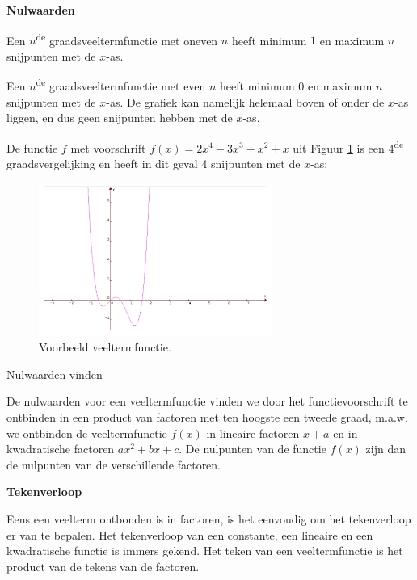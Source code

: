 \textbf{Nulwaarden}

 Een $n$\textsuperscript{de} graadsveeltermfunctie met oneven
$n$ heeft minimum $1$ en maximum $n$ snijpunten met de $x$-as.

 Een $n$\textsuperscript{de} graadsveeltermfunctie met even
$n$ heeft minimum $0$ en maximum $n$ snijpunten met de $x$-as. De grafiek
kan namelijk helemaal boven of onder de $x$-as liggen, en dus geen
snijpunten hebben met de $x$-as.



\begin{voorbeeld}
	De functie $f$ met voorschrift $f(x)=2x^{4}-3x^{3}-x^{2}+x$ uit Figuur \ref{fig:vt:vb1}
is een 4\textsuperscript{de} graadsvergelijking en heeft in dit geval
4 snijpunten met de $x$-as:

\begin{figure}[h]
\centering{}\includegraphics[height=5cm]{2_elem_rekenvaardigheden_B/inputs/veeltermfuncties3.jpg} 
\caption{Voorbeeld veeltermfunctie.}
\label{fig:vt:vb1}
\end{figure}

\end{voorbeeld}

Nulwaarden vinden

De nulwaarden voor een veeltermfunctie vinden we door het
functievoorschrift te ontbinden in een product van factoren met ten
hoogste een tweede graad, m.a.w. we ontbinden de veeltermfunctie $f(x)$
in lineaire factoren $x+a$ en in kwadratische factoren $ax^{2}+bx+c$.
De nulpunten van de functie $f(x)$ zijn dan de nulpunten van de verschillende
factoren.

\textbf{Tekenverloop}

Eens een veelterm ontbonden is in factoren, is het eenvoudig
om het tekenverloop er van te bepalen. Het tekenverloop van een constante,
een lineaire en een kwadratische functie is immers gekend. Het teken
van een veeltermfunctie is het product van de tekens van de factoren.


